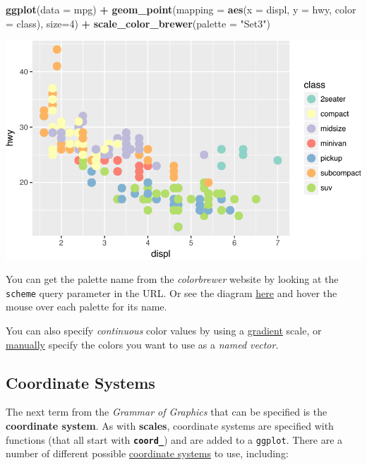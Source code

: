 \documentclass[]{book}
\newenvironment{Shaded}{\begin{snugshade}}{\end{snugshade}}
\newcommand{\KeywordTok}[1]{\textcolor[rgb]{0.13,0.29,0.53}{\textbf{#1}}}
\newcommand{\DataTypeTok}[1]{\textcolor[rgb]{0.13,0.29,0.53}{#1}}
\newcommand{\DecValTok}[1]{\textcolor[rgb]{0.00,0.00,0.81}{#1}}
\newcommand{\StringTok}[1]{\textcolor[rgb]{0.31,0.60,0.02}{#1}}
\newcommand{\OperatorTok}[1]{\textcolor[rgb]{0.81,0.36,0.00}{\textbf{#1}}}
\newcommand{\NormalTok}[1]{#1}
\theoremstyle{definition}
\theoremstyle{definition}
\theoremstyle{remark}
\begin{document}
\begin{Shaded}
\begin{Highlighting}[]
\KeywordTok{ggplot}\NormalTok{(}\DataTypeTok{data =}\NormalTok{ mpg) }\OperatorTok{+}
\StringTok{  }\KeywordTok{geom_point}\NormalTok{(}\DataTypeTok{mapping =} \KeywordTok{aes}\NormalTok{(}\DataTypeTok{x =}\NormalTok{ displ, }\DataTypeTok{y =}\NormalTok{ hwy, }\DataTypeTok{color =}\NormalTok{ class), }\DataTypeTok{size=}\DecValTok{4}\NormalTok{) }\OperatorTok{+}
\StringTok{  }\KeywordTok{scale_color_brewer}\NormalTok{(}\DataTypeTok{palette =} \StringTok{"Set3"}\NormalTok{)}
\end{Highlighting}
\end{Shaded}

\includegraphics{img/ggplot2/brewer_point-1.pdf}

You can get the palette name from the \emph{colorbrewer} website by
looking at the \texttt{scheme} query parameter in the URL. Or see the
diagram \href{https://bl.ocks.org/mbostock/5577023}{here} and hover the
mouse over each palette for its name.

You can also specify \emph{continuous} color values by using a
\href{http://ggplot2.tidyverse.org/reference/scale_gradient.html}{gradient}
scale, or
\href{http://ggplot2.tidyverse.org/reference/scale_manual.html}{manually}
specify the colors you want to use as a \emph{named vector}.

\hypertarget{coordinate-systems}{\subsection{Coordinate
Systems}\label{coordinate-systems}}

The next term from the \emph{Grammar of Graphics} that can be specified
is the \textbf{coordinate system}. As with \textbf{scales}, coordinate
systems are specified with functions (that all start with
\textbf{\texttt{coord\_}}) and are added to a \texttt{ggplot}. There are
a number of different possible
\href{http://ggplot2.tidyverse.org/reference/index.html\#section-coordinate-systems}{coordinate
systems} to use, including:
\end{document}
